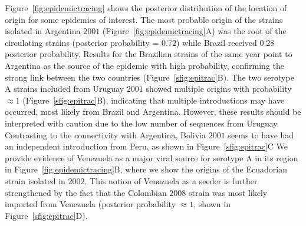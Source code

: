 \documentclass[10pt]{article}
\begin{document}
Figure~\ref{fig:epidemictracing} shows the posterior distribution of the location of origin for some epidemics of interest.
The most probable origin of the strains isolated in Argentina $2001$ (Figure~\ref{fig:epidemictracing}A) was the root of the circulating strains (posterior probability = $0.72$) while Brazil received $0.28$ posterior probability.
Results for the Brazilian strains of the same year point to Argentina as the source of the epidemic with high probability, confirming the strong link between the two countries (Figure~\ref{sfig:epitrac}B).
The two serotype A strains included from Uruguay $2001$ showed multiple origins with probability $\approx 1$ (Figure~\ref{sfig:epitrac}B), indicating that multiple introductions may have occurred, most likely from Brazil and Argentina.
However, these results should be interpreted with caution due to the low number of sequences from Uruguay.
Contrasting to the connectivity with Argentina, Bolivia $2001$ seems to have had an independent introduction from Peru, as shown in Figure~\ref{sfig:epitrac}C
We provide evidence of Venezuela as a major viral source for serotype A in its region in Figure~\ref{fig:epidemictracing}B, where we show the origins of the Ecuadorian strain isolated in $2002$.
This notion of Venezuela as a seeder is further strengthened by the fact that the Colombian $2008$ strain was most likely imported from Venezuela (posterior probability $\approx 1$, shown in Figure~\ref{sfig:epitrac}D).
\end{document}
